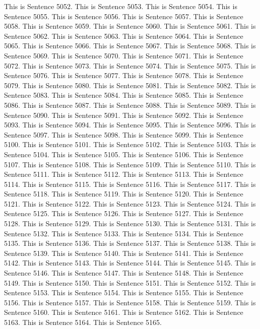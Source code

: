 \documentclass{article}
\begin{document}
This is Sentence 5052.
This is Sentence 5053.
This is Sentence 5054.
This is Sentence 5055.
This is Sentence 5056.
This is Sentence 5057.
This is Sentence 5058.
This is Sentence 5059.
This is Sentence 5060.
This is Sentence 5061.
This is Sentence 5062.
This is Sentence 5063.
This is Sentence 5064.
This is Sentence 5065.
This is Sentence 5066.
This is Sentence 5067.
This is Sentence 5068.
This is Sentence 5069.
This is Sentence 5070.
This is Sentence 5071.
This is Sentence 5072.
This is Sentence 5073.
This is Sentence 5074.
This is Sentence 5075.
This is Sentence 5076.
This is Sentence 5077.
This is Sentence 5078.
This is Sentence 5079.
This is Sentence 5080.
This is Sentence 5081.
This is Sentence 5082.
This is Sentence 5083.
This is Sentence 5084.
This is Sentence 5085.
This is Sentence 5086.
This is Sentence 5087.
This is Sentence 5088.
This is Sentence 5089.
This is Sentence 5090.
This is Sentence 5091.
This is Sentence 5092.
This is Sentence 5093.
This is Sentence 5094.
This is Sentence 5095.
This is Sentence 5096.
This is Sentence 5097.
This is Sentence 5098.
This is Sentence 5099.
This is Sentence 5100.
This is Sentence 5101.
This is Sentence 5102.
This is Sentence 5103.
This is Sentence 5104.
This is Sentence 5105.
This is Sentence 5106.
This is Sentence 5107.
This is Sentence 5108.
This is Sentence 5109.
This is Sentence 5110.
This is Sentence 5111.
This is Sentence 5112.
This is Sentence 5113.
This is Sentence 5114.
This is Sentence 5115.
This is Sentence 5116.
This is Sentence 5117.
This is Sentence 5118.
This is Sentence 5119.
This is Sentence 5120.
This is Sentence 5121.
This is Sentence 5122.
This is Sentence 5123.
This is Sentence 5124.
This is Sentence 5125.
This is Sentence 5126.
This is Sentence 5127.
This is Sentence 5128.
This is Sentence 5129.
This is Sentence 5130.
This is Sentence 5131.
This is Sentence 5132.
This is Sentence 5133.
This is Sentence 5134.
This is Sentence 5135.
This is Sentence 5136.
This is Sentence 5137.
This is Sentence 5138.
This is Sentence 5139.
This is Sentence 5140.
This is Sentence 5141.
This is Sentence 5142.
This is Sentence 5143.
This is Sentence 5144.
This is Sentence 5145.
This is Sentence 5146.
This is Sentence 5147.
This is Sentence 5148.
This is Sentence 5149.
This is Sentence 5150.
This is Sentence 5151.
This is Sentence 5152.
This is Sentence 5153.
This is Sentence 5154.
This is Sentence 5155.
This is Sentence 5156.
This is Sentence 5157.
This is Sentence 5158.
This is Sentence 5159.
This is Sentence 5160.
This is Sentence 5161.
This is Sentence 5162.
This is Sentence 5163.
This is Sentence 5164.
This is Sentence 5165.
\end{document}
